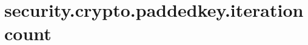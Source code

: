 \section{security.crypto.paddedkey.iterationcount}
\label{configuration:SecurityCryptoPaddedkeyIterationcount}
\AvailableInJavaOnly{\TODO}